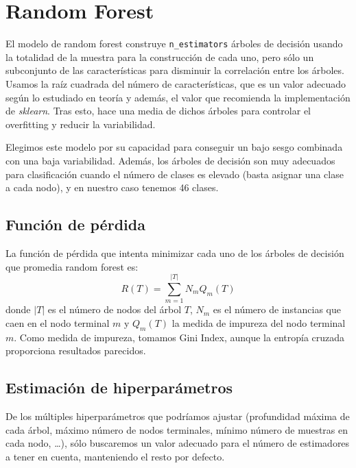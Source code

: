 \documentclass[a4]{article}
\begin{document}
\section{Random Forest}

El modelo de random forest construye \texttt{n\_estimators} árboles de decisión usando la totalidad de la muestra para la construcción de cada uno, pero sólo un subconjunto de las características para disminuir la correlación entre los árboles. Usamos la raíz cuadrada del número de características, que es un valor adecuado según lo estudiado en teoría y además, el valor que recomienda la implementación de \textit{sklearn}. Tras esto, hace una media de dichos árboles para controlar el overfitting y reducir la variabilidad.

Elegimos este modelo por su capacidad para conseguir un bajo sesgo combinada con una baja variabilidad. Además, los árboles de decisión son muy adecuados para clasificación cuando el número de clases es elevado (basta asignar una clase a cada nodo), y en nuestro caso tenemos 46 clases.

\subsection{Función de pérdida}

La función de pérdida que intenta minimizar cada uno de los árboles de decisión que promedia random forest es:
\[R(T) = \sum\limits_{m=1}^{|T|} N_mQ_m(T)\]
donde $|T|$ es el número de nodos del árbol $T$, $N_m$ es el número de instancias que caen en el nodo terminal $m$ y $Q_m(T)$ la medida de impureza del nodo terminal $m$. Como medida de impureza, tomamos Gini Index, aunque la entropía cruzada proporciona resultados parecidos.

\subsection{Estimación de hiperparámetros}

De los múltiples hiperparámetros que podríamos ajustar (profundidad máxima de cada árbol, máximo número de nodos terminales, mínimo número de muestras en cada nodo, \ldots), sólo buscaremos un valor adecuado para el número de estimadores a tener en cuenta, manteniendo el resto por defecto.
\end{document}

